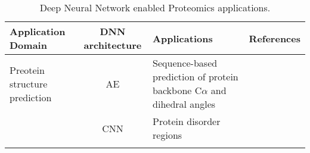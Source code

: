 \begin{table}[h!]
\centering
\begin{tabular}{|| l | c | l | l ||}
    \hline
    Application Domain & DNN architecture & Applications & References\\
    \hline \hline
    Preotein structure prediction & AE & Sequence-based prediction of protein backbone C$\alpha$ and dihedral angles & \\
    & CNN & Protein disorder regions & \\
    & 
    \hline
\end{tabular}
\caption{Deep Neural Network enabled Proteomics applications.}
\label{tab:PS-DNN}
\end{table}